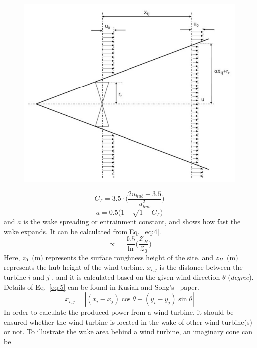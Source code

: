 \documentclass[]{iptconf}
\begin{document}
\begin{figure}[h!]
	\centering
	\includegraphics[width=0.9\columnwidth]{Pictures/Wake model.png}
	\label{fig:pic1}
\end{figure}
\begin{equation}
	\label{eq:2}
	C_T=3.5\cdot\Bigg(\dfrac{2u_{hub}-3.5}{u_{hub}^2}\Bigg)
\end{equation}
\begin{equation}
	\label{eq:3}
	a=0.5\bigg(1-\sqrt{1-C_T}\bigg)
\end{equation}
and $a$ is the wake spreading or entrainment constant, and shows how fast the wake
expands. It can be calculated from Eq.~\eqref{eq:4}.
\begin{equation}
	\label{eq:4}
	\propto=\dfrac{0.5}{\ln}\Bigg(\dfrac{\mathcal{Z}_H}{\mathcal{Z}_0}\Bigg)
\end{equation}
Here, $z_0$~(m) represents the surface roughness height of the site, and $z_H$~(m)
represents the hub height of the wind turbine.
$x_{i,j}$ is the distance between the turbine $i$ and $j$ , and it is calculated based on the
given wind direction $\theta$ (\textit{degree}). Details of Eq.~\eqref{eq:5} can be found in Kusiak and
Song's~\cite{Kusiak2010} paper.
\begin{equation}
	\label{eq:5}
	x_{i,j}=|(x_i-x_j)\cos\theta+(y_i-y_j)\sin\theta|
\end{equation}   
In order to calculate the produced power from a wind turbine, it should be
ensured whether the wind turbine is located in the wake of other wind turbine(s)
or not. To illustrate the wake area behind a wind turbine, an imaginary cone can be
\end{document}
